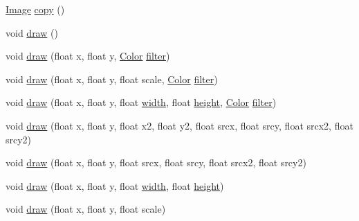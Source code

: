 \begin{DoxyCompactItemize}
\mbox{\hyperlink{classorg_1_1newdawn_1_1slick_1_1_image}{Image}} \mbox{\hyperlink{classorg_1_1newdawn_1_1slick_1_1_big_image_aac83f6ad3f920d86ae7497aa9c417e59}{copy}} ()
\item 
void \mbox{\hyperlink{classorg_1_1newdawn_1_1slick_1_1_big_image_a75b5b008adf93b038aa56e9cfefd1a1c}{draw}} ()
\item 
void \mbox{\hyperlink{classorg_1_1newdawn_1_1slick_1_1_big_image_a9d8d3cd60f080ca6dd768d9ed372d55a}{draw}} (float x, float y, \mbox{\hyperlink{classorg_1_1newdawn_1_1slick_1_1_color}{Color}} \mbox{\hyperlink{classorg_1_1newdawn_1_1slick_1_1_image_a1c6f09687817420f3762f32bb1c3ed76}{filter}})
\item 
void \mbox{\hyperlink{classorg_1_1newdawn_1_1slick_1_1_big_image_a71cce2570f2cac6e4ba45ffd9715fed9}{draw}} (float x, float y, float scale, \mbox{\hyperlink{classorg_1_1newdawn_1_1slick_1_1_color}{Color}} \mbox{\hyperlink{classorg_1_1newdawn_1_1slick_1_1_image_a1c6f09687817420f3762f32bb1c3ed76}{filter}})
\item 
void \mbox{\hyperlink{classorg_1_1newdawn_1_1slick_1_1_big_image_a92da30010cfd28306b7cba7fd6f04acb}{draw}} (float x, float y, float \mbox{\hyperlink{classorg_1_1newdawn_1_1slick_1_1_image_a7d02c85e21b388428cfe5cc5c82714a1}{width}}, float \mbox{\hyperlink{classorg_1_1newdawn_1_1slick_1_1_image_a54397a37823bc59ddc79ec70dc5cf226}{height}}, \mbox{\hyperlink{classorg_1_1newdawn_1_1slick_1_1_color}{Color}} \mbox{\hyperlink{classorg_1_1newdawn_1_1slick_1_1_image_a1c6f09687817420f3762f32bb1c3ed76}{filter}})
\item 
void \mbox{\hyperlink{classorg_1_1newdawn_1_1slick_1_1_big_image_a6e6dcf9c205a3723757bdb162723842c}{draw}} (float x, float y, float x2, float y2, float srcx, float srcy, float srcx2, float srcy2)
\item 
void \mbox{\hyperlink{classorg_1_1newdawn_1_1slick_1_1_big_image_a0dabada05695125d9e42a4e4b475e1c3}{draw}} (float x, float y, float srcx, float srcy, float srcx2, float srcy2)
\item 
void \mbox{\hyperlink{classorg_1_1newdawn_1_1slick_1_1_big_image_a08d439d7c21b87544e0e72de28773fbc}{draw}} (float x, float y, float \mbox{\hyperlink{classorg_1_1newdawn_1_1slick_1_1_image_a7d02c85e21b388428cfe5cc5c82714a1}{width}}, float \mbox{\hyperlink{classorg_1_1newdawn_1_1slick_1_1_image_a54397a37823bc59ddc79ec70dc5cf226}{height}})
\item 
void \mbox{\hyperlink{classorg_1_1newdawn_1_1slick_1_1_big_image_ab5a981b5afffa76f8fe40e3960f921db}{draw}} (float x, float y, float scale)

\end{DoxyCompactItemize}
